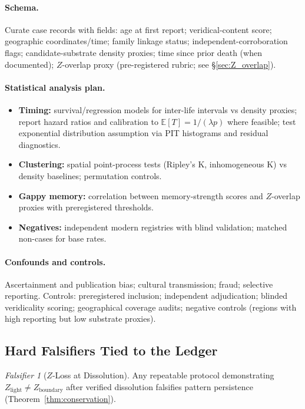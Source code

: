 \documentclass[11pt,letterpaper]{article}
\theoremstyle{definition}
\theoremstyle{remark}
\newtheorem{falsifier}[theorem]{Falsifier}
\begin{document}
\paragraph{Schema.}
Curate case records with fields: age at first report; veridical-content score; geographic coordinates/time; family linkage status; independent-corroboration flags; candidate-substrate density proxies; time since prior death (when documented); \(Z\)-overlap proxy (pre-registered rubric; see §\ref{sec:Z_overlap}).

\paragraph{Statistical analysis plan.}
\begin{itemize}
  \item \textbf{Timing:} survival/regression models for inter-life intervals vs density proxies; report hazard ratios and calibration to \(\mathbb{E}[T]=1/(\lambda p)\) where feasible; test exponential distribution assumption via PIT histograms and residual diagnostics.
  \item \textbf{Clustering:} spatial point-process tests (Ripley's K, inhomogeneous K) vs density baselines; permutation controls.
  \item \textbf{Gappy memory:} correlation between memory-strength scores and \(Z\)-overlap proxies with preregistered thresholds.
  \item \textbf{Negatives:} independent modern registries with blind validation; matched non-cases for base rates.
\end{itemize}

\paragraph{Confounds and controls.}
Ascertainment and publication bias; cultural transmission; fraud; selective reporting. Controls: preregistered inclusion; independent adjudication; blinded veridicality scoring; geographical coverage audits; negative controls (regions with high reporting but low substrate proxies).

\subsection{Hard Falsifiers Tied to the Ledger}

\begin{falsifier}[\texorpdfstring{\(Z\)}{Z}-Loss at Dissolution]
Any repeatable protocol demonstrating \(Z_{\mathrm{light}}\ne Z_{\mathrm{boundary}}\) after verified dissolution falsifies pattern persistence (Theorem~\ref{thm:conservation}).
\end{falsifier}
\end{document}
